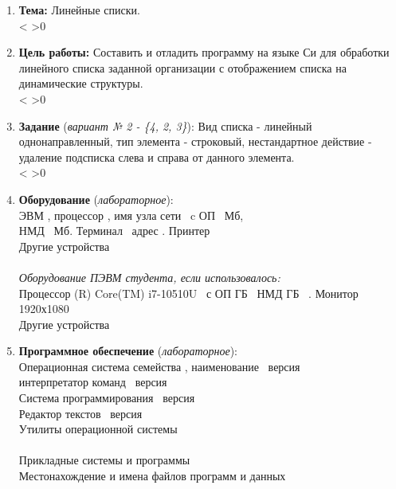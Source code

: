 \documentclass[a4paper]{article}
\makeatletter
\newcounter{i}
\newcommand{\PrintEmptyLines}[1]{\setcounter{i}{1}\@whilenum\value{i}<#1\do{\stepcounter{i}\EmptyLine\\} \ifnum #1>0 {\EmptyLine}\fi}
\newcommand\arulefill[1]{{\expandafter \ulined #1 \hfill}}
\newcommand{\EmptyLine}{\null\arulefill{}}
\newcounter{EmptyLines1}
\newcounter{EmptyLines2}
\newcounter{EmptyLines3}
\newcounter{EmptyLines10}
\newcounter{EmptyLines11}
\newcounter{EmptyLines12}
\newcommand{\NumberVariant}{2 - \{4, 2, 3\}}  %
\newcommand{\Texti}{}  %
\newcommand{\Textii}{
}  %
\newcommand{\Textiii}{
}  %
\makeatother
\begin{document}
\begin{enumerate}[label=\textbf{\arabic*}.]

\item \textbf{Тема:} {\footnotesize Линейные списки.} \arulefill{\Texti} \\ 
\PrintEmptyLines{\value{EmptyLines1}}

\item \textbf{Цель работы:} {\footnotesize Составить и отладить программу на языке Си для обработки линейного списка заданной организации с отображением списка на динамические структуры.} \arulefill{\Textii} \\
\PrintEmptyLines{\value{EmptyLines2}}

\item \textbf{Задание} (\textit{вариант № \NumberVariant}): {\footnotesize Вид списка - линейный однонаправленный, тип элемента - строковый, нестандартное действие - удаление подсписка слева и справа от данного элемента.} \arulefill{\Textiii} \\
\PrintEmptyLines{\value{EmptyLines3}}

\item \textbf{Оборудование} (\textit{лабораторное}):\\
ЭВМ \EmptyLine, процессор \EmptyLine, имя узла сети \EmptyLine \ c ОП \EmptyLine \ Мб,\\
НМД \EmptyLine \ Мб. Терминал \EmptyLine \ адрес \EmptyLine. Принтер \EmptyLine \\
Другие устройства \EmptyLine \\ \EmptyLine \\

\textit{Оборудование ПЭВМ студента, если использовалось:}\\
Процессор \arulefill{Intel(R) Core(TM) i7-10510U}\EmptyLine \ с ОП \arulefill{8 ГБ}\EmptyLine \, НМД \arulefill{SSD 512 ГБ}\EmptyLine \ . Монитор \arulefill{Встроенный 1920х1080}\EmptyLine \\
Другие устройства \arulefill{}\EmptyLine \\ \EmptyLine

\item \textbf{Программное обеспечение} (\textit{лабораторное}):\\
Операционная система семейства \EmptyLine, наименование \EmptyLine \ версия \EmptyLine \\
интерпретатор команд \EmptyLine \ версия \EmptyLine \\
Система программирования \EmptyLine \ версия \EmptyLine \\
Редактор текстов \EmptyLine \ версия \EmptyLine \\
Утилиты операционной системы \EmptyLine \\ \EmptyLine \\
Прикладные системы и программы \EmptyLine \\
Местонахождение и имена файлов программ и данных \EmptyLine \\ \EmptyLine \\


\end{enumerate}
\end{document}
